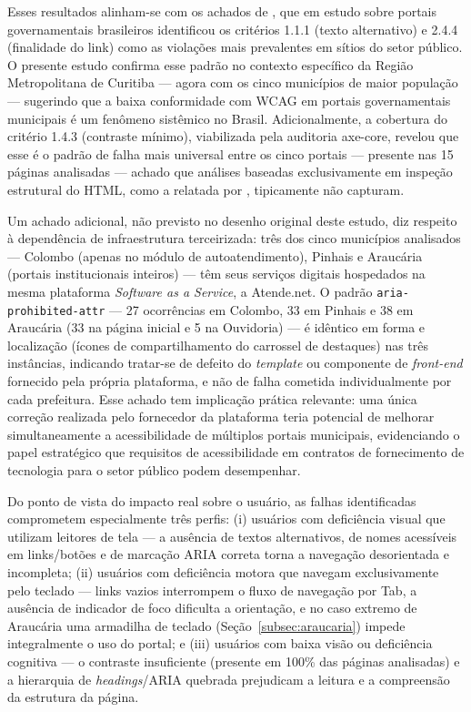 \documentclass[brazil]{ifpr-pinhais}
\begin{document}
Esses resultados alinham-se com os achados de , que em estudo sobre portais governamentais brasileiros identificou os critérios 1.1.1 (texto alternativo) e 2.4.4 (finalidade do link) como as violações mais prevalentes em sítios do setor público. O presente estudo confirma esse padrão no contexto específico da Região Metropolitana de Curitiba --- agora com os cinco municípios de maior população --- sugerindo que a baixa conformidade com WCAG em portais governamentais municipais é um fenômeno sistêmico no Brasil. Adicionalmente, a cobertura do critério 1.4.3 (contraste mínimo), viabilizada pela auditoria axe-core, revelou que esse é o padrão de falha mais universal entre os cinco portais --- presente nas 15 páginas analisadas --- achado que análises baseadas exclusivamente em inspeção estrutural do HTML, como a relatada por , tipicamente não capturam.

Um achado adicional, não previsto no desenho original deste estudo, diz respeito à dependência de infraestrutura terceirizada: três dos cinco municípios analisados --- Colombo (apenas no módulo de autoatendimento), Pinhais e Araucária (portais institucionais inteiros) --- têm seus serviços digitais hospedados na mesma plataforma \textit{Software as a Service}, a Atende.net. O padrão \texttt{aria-prohibited-attr} --- 27 ocorrências em Colombo, 33 em Pinhais e 38 em Araucária (33 na página inicial e 5 na Ouvidoria) --- é idêntico em forma e localização (ícones de compartilhamento do carrossel de destaques) nas três instâncias, indicando tratar-se de defeito do \textit{template} ou componente de \textit{front-end} fornecido pela própria plataforma, e não de falha cometida individualmente por cada prefeitura. Esse achado tem implicação prática relevante: uma única correção realizada pelo fornecedor da plataforma teria potencial de melhorar simultaneamente a acessibilidade de múltiplos portais municipais, evidenciando o papel estratégico que requisitos de acessibilidade em contratos de fornecimento de tecnologia para o setor público podem desempenhar.

Do ponto de vista do impacto real sobre o usuário, as falhas identificadas comprometem especialmente três perfis: (i) usuários com deficiência visual que utilizam leitores de tela --- a ausência de textos alternativos, de nomes acessíveis em links/botões e de marcação ARIA correta torna a navegação desorientada e incompleta; (ii) usuários com deficiência motora que navegam exclusivamente pelo teclado --- links vazios interrompem o fluxo de navegação por Tab, a ausência de indicador de foco dificulta a orientação, e no caso extremo de Araucária uma armadilha de teclado (Seção~\ref{subsec:araucaria}) impede integralmente o uso do portal; e (iii) usuários com baixa visão ou deficiência cognitiva --- o contraste insuficiente (presente em 100\% das páginas analisadas) e a hierarquia de \textit{headings}/ARIA quebrada prejudicam a leitura e a compreensão da estrutura da página.
\end{document}
